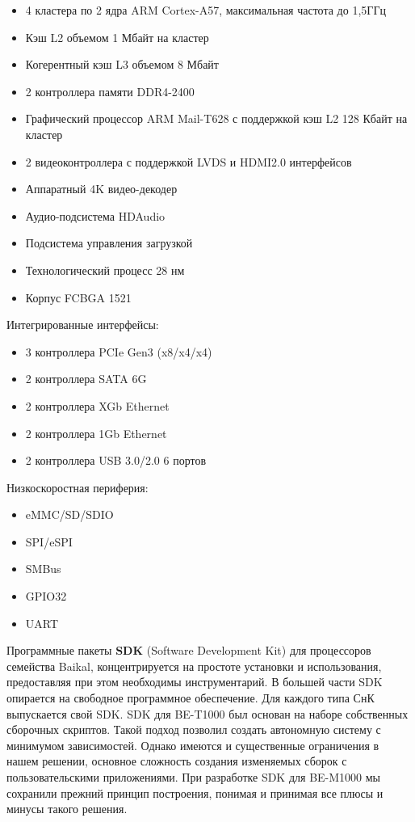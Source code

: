 \documentclass[10pt, a5paper]{article}
\begin{document}
\begin{itemize}
  \item 4 кластера по 2 ядра ARM Cortex-A57, максимальная частота до 1,5ГГц
  \item Кэш L2 объемом 1 Мбайт на кластер
  \item Когерентный кэш L3 объемом 8 Мбайт
  \item 2 контроллера памяти DDR4-2400
  \item Графический процессор ARM Mail-T628 с поддержкой кэш L2 128 Кбайт на кластер
  \item 2 видеоконтроллера с поддержкой LVDS и HDMI2.0 интерфейсов
  \item Аппаратный 4K видео-декодер
  \item Аудио-подсистема HDAudio
  \item Подсистема управления загрузкой
  \item Технологический процесс 28 нм
  \item Корпус FCBGA 1521
\end{itemize}

Интегрированные интерфейсы:

\begin{itemize}
  \item 3 контроллера PCIe Gen3 (x8/x4/x4)
  \item 2 контроллера SATA 6G
  \item 2 контроллера XGb Ethernet
  \item 2 контроллера 1Gb Ethernet
  \item 2 контроллера USB 3.0/2.0 6 портов
\end{itemize}

Низкоскоростная периферия:

\begin{itemize}
  \item eMMC/SD/SDIO
  \item SPI/eSPI
  \item SMBus
  \item GPIO32
  \item UART
\end{itemize}

Программные пакеты \textbf{SDK} (Software Development Kit) для процессоров семейства Baikal, концентрируется на простоте установки и использования, предоставляя при этом необходимы инструментарий. В большей части SDK опирается на свободное программное обеспечение. Для каждого типа СнК выпускается свой SDK. SDK для BE-T1000 был основан на наборе собственных сборочных скриптов. Такой подход позволил создать автономную систему с минимумом зависимостей. Однако имеются и существенные ограничения в нашем решении, основное сложность создания изменяемых сборок с пользовательскими приложениями. При разработке SDK для BE-M1000 мы сохранили прежний принцип построения, понимая и принимая все плюсы и минусы такого решения.
\end{document}
